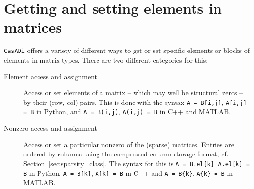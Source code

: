 \documentclass[a4paper,12pt]{book}
\newcommand{\CasADi}{\texttt{CasADi}\xspace}
\begin{document}

\section{Getting and setting elements in matrices} \label{sec:getset}
\CasADi offers a variety of different ways to get or set specific elements or blocks of elements in matrix types. There are two different categories for this:

\begin{description}
\item[Element access and assignment] Access or set elements of a matrix -- which may well be structural zeros --  by their (row, col) pairs. This is done with the syntax \verb|A = B[i,j]|, \verb|A[i,j] = B| in Python, and \verb|A = B(i,j)|, \verb|A(i,j) = B| in C++ and MATLAB.
\item[Nonzero access and assignment] Access or set a particular nonzero of the (sparse) matrices. Entries are ordered by columns using the compressed column storage format, cf. Section~\ref{sec:sparsity_class}. The syntax for this is \verb|A = B.el[k]|, \verb|A.el[k] = B| in Python, \verb|A = B[k]|, \verb|A[k] = B| in C++ and \verb|A = B{k}|, \verb|A{k} = B| in MATLAB.
\end{description}
\end{document}

